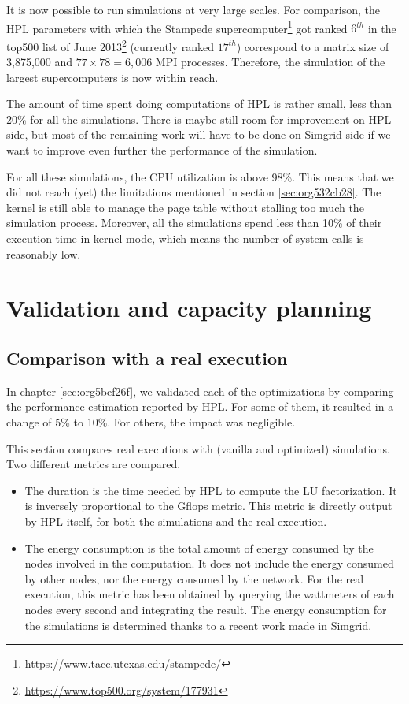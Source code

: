 \documentclass[12pt, a4paper]{memoir}
\begin{document}
It is now possible to run simulations at very large scales. For comparison, the HPL parameters with which the
Stampede supercomputer\footnote{\url{https://www.tacc.utexas.edu/stampede/}} got ranked \(6^{th}\) in the top500 list of June 2013\footnote{\url{https://www.top500.org/system/177931}}
(currently ranked \(17^{th}\)) correspond to a matrix size of 3,875,000 and \(77 \times 78 = 6,006\) MPI processes. Therefore, the
simulation of the largest supercomputers is now within reach.

The amount of time spent doing computations of HPL is rather small, less than 20\% for all the simulations. There is
maybe still room for improvement on HPL side, but most of the remaining work will have to be done on Simgrid side if we
want to improve even further the performance of the simulation.

For all these simulations, the CPU utilization is above 98\%. This means that we did not reach (yet) the limitations
mentioned in section \ref{sec:org532cb28}. The kernel is still able to manage the page table without stalling too
much the simulation process. Moreover, all the simulations spend less than 10\% of their execution time in kernel
mode, which means the number of system calls is reasonably low.

\chapter{Validation and capacity planning}
\label{sec:org1697fb2}
\section{Comparison with a real execution}
\label{sec:org8c1d01f}
In chapter \ref{sec:org5bef26f}, we validated each of the optimizations by comparing the performance estimation reported by
HPL. For some of them, it resulted in a change of 5\% to 10\%. For others, the impact was negligible.

This section compares real executions with (vanilla and optimized) simulations. Two different metrics are compared.
\begin{itemize}
\item The duration is the time needed by HPL to compute the LU factorization. It is inversely proportional to the Gflops
metric. This metric is directly output by HPL itself, for both the simulations and the real execution.
\item The energy consumption is the total amount of energy consumed by the nodes involved in the computation. It does not
include the energy consumed by other nodes, nor the energy consumed by the network. For the real execution, this
metric has been obtained by querying the wattmeters of each nodes every second and integrating the result. The
energy consumption for the simulations is determined thanks to a recent work made in
Simgrid\cite{heinrich:hal-01523608}.
\end{itemize}
\end{document}
